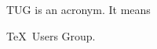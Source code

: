 \documentclass{article}
\begin{document}
\parbox{3cm}{TUG is an acronym. It means

\TeX\ Users Group.}
\end{document}
